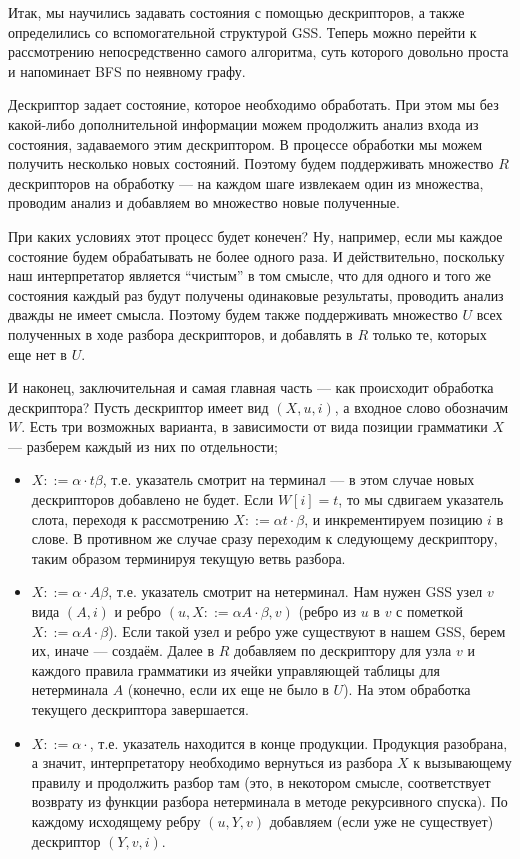 Итак, мы научились задавать состояния с помощью дескрипторов, а также определились со вспомогательной структурой GSS. Теперь можно перейти к рассмотрению непосредственно самого алгоритма, суть которого довольно проста и напоминает BFS по неявному графу.

Дескриптор задает состояние, которое необходимо обработать. При этом мы без какой-либо дополнительной информации можем продолжить анализ входа из состояния, задаваемого этим дескриптором. В процессе обработки мы можем получить несколько новых состояний. Поэтому будем поддерживать множество $ R $ дескрипторов на обработку --- на каждом шаге извлекаем один из множества, проводим анализ и добавляем во множество новые полученные.

При каких условиях этот процесс будет конечен? Ну, например, если мы каждое состояние будем обрабатывать не более одного раза. И действительно, поскольку наш интерпретатор является ``чистым'' в том смысле, что для одного и того же состояния каждый раз будут получены одинаковые результаты, проводить анализ дважды не имеет смысла. Поэтому будем также поддерживать множество $ U $ всех полученных в ходе разбора дескрипторов, и добавлять в $ R $ только те, которых еще нет в $ U $.

И наконец, заключительная и самая главная часть --- как происходит обработка дескриптора?
Пусть дескриптор имеет вид $ (X, u, i) $, а входное слово обозначим $ W $. Есть три возможных варианта, в зависимости от вида позиции грамматики $ X $ --- разберем каждый из них по отдельности;

\begin{itemize}
  \item $ X ::= \alpha \cdot t \beta $, т.е. указатель смотрит на терминал --- в этом случае новых дескрипторов добавлено не будет. Если $ W[i] = t $, то мы сдвигаем указатель слота, переходя к рассмотрению $ X ::= \alpha t \cdot \beta $, и инкрементируем позицию $ i $ в слове. В противном же случае сразу переходим к следующему дескриптору, таким образом терминируя текущую ветвь разбора.

  \item $ X ::= \alpha \cdot A \beta $, т.е. указатель смотрит на нетерминал. Нам нужен GSS узел $ v $ вида $ (A, i) $ и ребро $ (u, X ::= \alpha A \cdot \beta, v) $ (ребро из $ u $ в $ v $ с пометкой $ X ::= \alpha A \cdot \beta $). Если такой узел и ребро уже существуют в нашем GSS, берем их, иначе --- создаём. Далее в $ R $ добавляем по дескриптору для узла $ v $ и каждого правила грамматики из ячейки управляющей таблицы для нетерминала $ A $ (конечно, если их еще не было в $ U $). На этом обработка текущего дескриптора завершается.

  \item $ X ::= \alpha \cdot $, т.е. указатель находится в конце продукции. Продукция разобрана, а значит, интерпретатору необходимо вернуться из разбора $ X $ к вызывающему правилу и продолжить разбор там (это, в некотором смысле, соответствует возврату из функции разбора нетерминала в методе рекурсивного спуска). По каждому исходящему ребру $ (u, Y, v) $ добавляем (если уже не существует) дескриптор $(Y, v, i)$.
\end{itemize}

